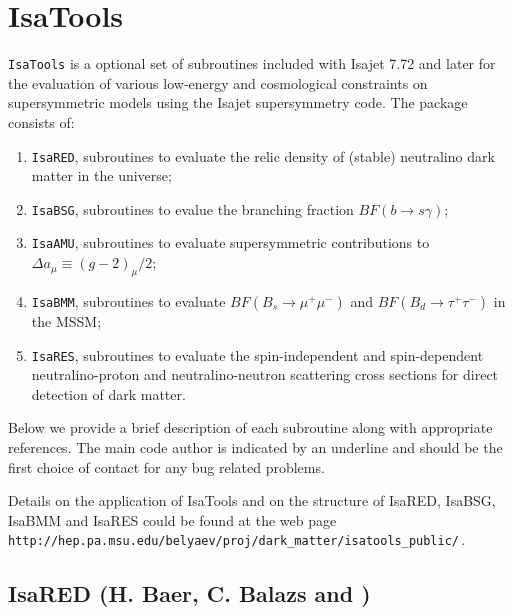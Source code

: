 \newpage
\section{IsaTools \label{Tools}}

\def\te{\tilde e}
\def\tl{\tilde l}
\def\tu{\tilde u}
\def\ts{\tilde s}
\def\tb{\tilde b}
\def\tc{\tilde c}
\def\tf{\tilde f}
\def\td{\tilde d}
\def\tQ{\tilde Q}
\def\tL{\tilde L}
\def\tH{\tilde H}
\def\tst{\tilde t}
\def\ttau{\tilde \tau}
\def\tmu{\tilde \mu}
\def\tg{\tilde g}
\def\tnu{\tilde\nu}
\def\tell{\tilde\ell}
\def\tg{\tilde g}
\def\tq{\tilde q}
\def\tw{\tilde W}
\def\tz{\tilde Z}
\def\alt{\stackrel{<}{\sim}}
\def\agt{\stackrel{>}{\sim}}

\verb|IsaTools| is a optional set of subroutines included with Isajet
7.72 and later for the evaluation of various low-energy and cosmological
constraints on supersymmetric models using the Isajet supersymmetry
code. The package consists of:
\begin{enumerate}
\item \verb|IsaRED|, subroutines to evaluate the relic density of
(stable) neutralino dark matter in the universe;
\item \verb|IsaBSG|, subroutines to evalue the branching fraction
$BF(b\to s\gamma )$;
\item \verb|IsaAMU|, subroutines to evaluate supersymmetric contributions to
$\Delta a_\mu\equiv (g-2)_\mu/2$;
\item \verb|IsaBMM|, subroutines to evaluate $BF(B_s\rightarrow
\mu^+\mu^-)$ and $BF(B_d\rightarrow \tau^+\tau^- )$ in the MSSM;
\item \verb|IsaRES|, subroutines to evaluate the spin-independent and
spin-dependent neutralino-proton and neutralino-neutron scattering cross
sections for direct detection of dark matter.
\end{enumerate}
Below we provide a brief description of each subroutine along with
appropriate references. The main code author is indicated by
an underline and should be the first choice of contact for any bug 
related problems.

Details on the application of IsaTools and on the structure of IsaRED,
IsaBSG, IsaBMM and IsaRES could be found at the web page\hfil\break
\verb|http://hep.pa.msu.edu/belyaev/proj/dark_matter/isatools_public/|\,.

\subsection{IsaRED (H. Baer, C. Balazs and )} 

